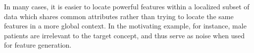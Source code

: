 \documentclass{article}
\theoremstyle{definition}
\begin{document}
In many cases, it is easier to locate powerful features within a localized subset of data which shares common attributes rather than trying to locate the same features in a more global context. In the motivating example, for instance, male patients are irrelevant to the target concept, and thus serve as noise when used for feature generation.
\end{document}
